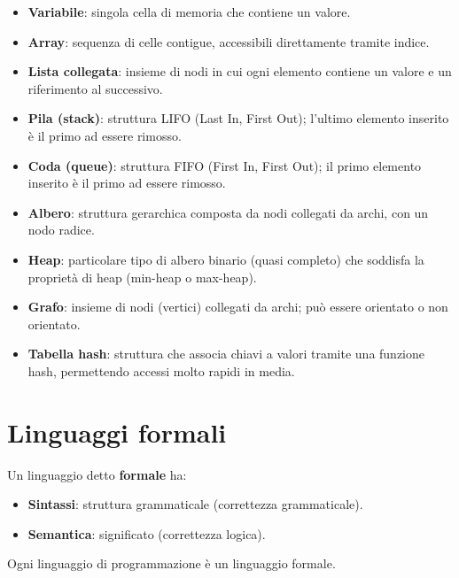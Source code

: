 \documentclass[a4paper,12pt]{article}
\let\oldsection\section
\renewcommand{\section}{\clearpage\oldsection}
\begin{document}
\begin{itemize}
  \item \textbf{Variabile}: singola cella di memoria che contiene un valore.
  
  \item \textbf{Array}: sequenza di celle contigue, accessibili direttamente tramite indice.
  
  \item \textbf{Lista collegata}: insieme di nodi in cui ogni elemento contiene un valore e un riferimento al successivo.
  
  \item \textbf{Pila (stack)}: struttura LIFO (Last In, First Out); l’ultimo elemento inserito è il primo ad essere rimosso.
  
  \item \textbf{Coda (queue)}: struttura FIFO (First In, First Out); il primo elemento inserito è il primo ad essere rimosso.
  
  \item \textbf{Albero}: struttura gerarchica composta da nodi collegati da archi, con un nodo radice.
  
  \item \textbf{Heap}: particolare tipo di albero binario (quasi completo) che soddisfa la proprietà di heap (min-heap o max-heap).
  
  \item \textbf{Grafo}: insieme di nodi (vertici) collegati da archi; può essere orientato o non orientato.
  
  \item \textbf{Tabella hash}: struttura che associa chiavi a valori tramite una funzione hash, permettendo accessi molto rapidi in media.
\end{itemize}

\section{Linguaggi formali}

Un linguaggio detto \textbf{formale} ha:
\begin{itemize}
  \item \textbf{Sintassi}: struttura grammaticale (correttezza grammaticale).
  \item \textbf{Semantica}: significato (correttezza logica).
\end{itemize}

Ogni linguaggio di programmazione è un linguaggio formale.
\end{document}
